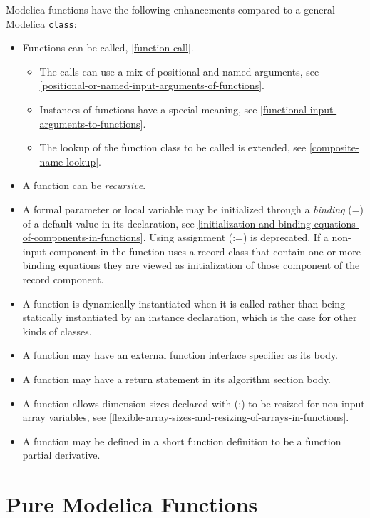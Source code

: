 Modelica functions have the following enhancements compared to a general
Modelica \lstinline!class!:
\begin{itemize}
\item
  Functions can be called, \autoref{function-call}.

  \begin{itemize}
  \item
    The calls can use a mix of positional and named arguments, see
    \autoref{positional-or-named-input-arguments-of-functions}.
  \item
    Instances of functions have a special meaning, see \autoref{functional-input-arguments-to-functions}.
  \item
    The lookup of the function class to be called is extended, see
    \autoref{composite-name-lookup}.
  \end{itemize}
\item
  A function can be \emph{recursive}.
\item
  A formal parameter or local variable may be initialized through a
  \emph{binding} (=) of a default value in its declaration,
  see \autoref{initialization-and-binding-equations-of-components-in-functions}.
  Using assignment (:=) is deprecated. If a non-input component in the
  function uses a record class that contain one or more binding
  equations they are viewed as initialization of those component of the
  record component.
\item
  A function is dynamically instantiated when it is called rather than
  being statically instantiated by an instance declaration, which is the
  case for other kinds of classes.
\item
  A function may have an external function interface specifier as its
  body.
\item
  A function may have a return statement in its algorithm section body.
\item
  A function allows dimension sizes declared with (:) to be resized for
  non-input array variables, see \autoref{flexible-array-sizes-and-resizing-of-arrays-in-functions}.
\item
  A function may be defined in a short function definition to be a
  function partial derivative.
\end{itemize}

\section{Pure Modelica Functions}

